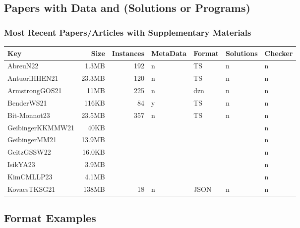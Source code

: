 \documentclass[dvipsnames,aspectratio=169]{beamer}
\begin{document}
\subsection{Papers with Data and (Solutions or Programs)}

\begin{frame}
\frametitle{Most Recent Papers/Articles with Supplementary Materials}

{\scriptsize
\begin{tabular}{lrrllll} \toprule
Key & Size & Instances & MetaData & Format & Solutions & Checker \\ \midrule
AbreuN22 \cite{AbreuN22} & 1.3MB & 192 & n & TS & n & n\\
AntuoriHHEN21 \cite{AntuoriHHEN21}& 23.3MB& 120 & n & TS & n & n\\
ArmstrongGOS21 \cite{ArmstrongGOS21}& 11MB & 225 & n & dzn & n & n\\
BenderWS21 \cite{BenderWS21}& 116KB& 84 & y & TS & n & n\\
Bit-Monnot23 \cite{Bit-Monnot23}& 23.5MB & 357 & n & TS & n & n\\
GeibingerKKMMW21 \cite{GeibingerKKMMW21}& 40KB& & & & & n\\
GeibingerMM21 \cite{GeibingerMM21}& 13.9MB & & & & & n\\
GeitzGSSW22 \cite{GeitzGSSW22}& 16.0KB & & & & & n\\
IsikYA23 \cite{IsikYA23} & 3.9MB & & & & & n\\
KimCMLLP23 \cite{KimCMLLP23}& 4.1MB & & & & & n\\
KovacsTKSG21 \cite{KovacsTKSG21}& 138MB & 18 & n & JSON & n & n\\
\bottomrule
\end{tabular}
}

\end{frame}


\subsection{Format Examples}
\end{document}
